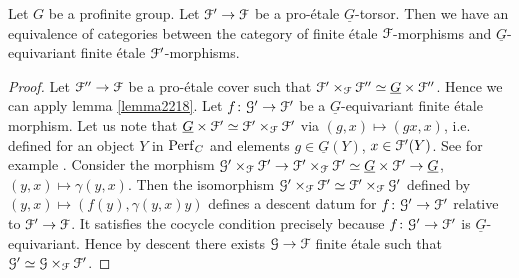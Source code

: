 \begin{theorem}\label{torsorthm1}
Let $G$ be a profinite group. Let $\mathcal{F}'\to\mathcal{F}$ be a  pro-\'{e}tale $\underline{G}$-torsor. Then we have an equivalence of categories between the category of finite \'{e}tale $\mathcal{F}$-morphisms and $\underline{G}$-equivariant finite \'{e}tale $\mathcal{F}'$-morphisms.
\end{theorem}
\begin{proof}
Let $\mathcal{F}''\to\mathcal{F}$ be a  pro-\'{e}tale cover such that  $\mathcal{F}'\times_{\mathcal{F}}\mathcal{F}''\simeq\underline{G}\times\mathcal{F}''$. Hence we can apply lemma \ref{lemma2218}.
Let $f\colon\mathcal{G}'\to\mathcal{F}'$ be a $\underline{G}$-equivariant finite \'{e}tale morphism. 
Let us note that 
$\underline{G}\times\mathcal{F}'\simeq\mathcal{F}'\times_{\mathcal{F}}\mathcal{F}'$ via $(g,x)\mapsto (gx,x)$, i.e. defined for an object $Y$ in $\mathrm{Perf}_{C}$ and elements $g\in\underline{G}(Y)$, $x\in\mathcal{F}'(Y)$. See for example \cite[proposition 4.43]{Vistoli05}.
Consider the morphism 
$\mathcal{G}'\times_{\mathcal{F}}\mathcal{F}'\to\mathcal{F}'\times_{\mathcal{F}}\mathcal{F}'\simeq\underline{G}\times\mathcal{F}'\to\underline{G}$, $(y,x)\mapsto \gamma(y,x)$. 
Then the isomorphism 
$\mathcal{G}'\times_{\mathcal{F}}\mathcal{F}'\simeq\mathcal{F}'\times_{\mathcal{F}}\mathcal{G}'$ defined by $(y,x)\mapsto (f(y), \gamma(y,x)y)$ defines a descent datum for $f\colon\mathcal{G}'\to\mathcal{F}'$ relative to $\mathcal{F}'\to\mathcal{F}$. 
It satisfies the cocycle condition precisely because $f\colon\mathcal{G}'\to\mathcal{F}'$ is $\underline{G}$-equivariant. Hence by descent there exists
$\mathcal{G}\to\mathcal{F}$ finite \'{e}tale such that
$\mathcal{G}'\simeq\mathcal{G}\times_{\mathcal{F}}\mathcal{F}'$.
\end{proof}

\clearpage
\hfill
\clearpage

















